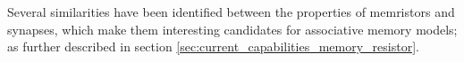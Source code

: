 
Several similarities have been identified between the properties of memristors and synapses, which make them interesting candidates for associative memory models; as further described in section \ref{sec:current_capabilities_memory_resistor}.


%


%

%

%

%


%

